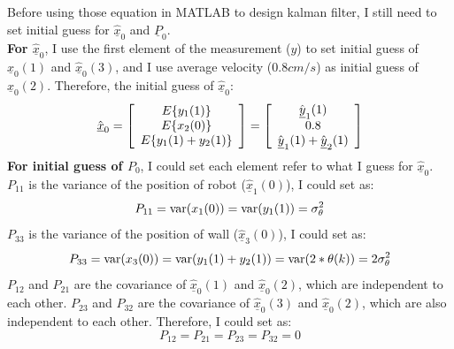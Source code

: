 \documentclass{article}
\begin{document}
Before using those equation in MATLAB to design kalman filter, I still need to set initial guess for $\hat{\underline{x}}_0$ and $\underline{P}_0$.\\
\textbf{For $\hat{\underline{x}}_0$}, I use the first element of the measurement ($y$) to set initial guess of $\hat{\underline{x}}_0 (1)$ and $\hat{\underline{x}}_0 (3)$, 
and I use average velocity ($0.8 cm/s$) as initial guess of $\hat{\underline{x}}_0 (2)$. Therefore, the initial guess of $\hat{\underline{x}}_0$:
\begin{equation}
\hat{\underline{x}}_0  = \left[ {\begin{array}{*{20}c}
   {E\{ y_1 (1)\} }  \\
   {E\{ x_2 (0)\} }  \\
   {E\{ y_1 (1) + y_2 (1)\} }  \\
\end{array}} \right] = \left[ {\begin{array}{*{20}c}
   {\hat{\underline{y}}_1 (1)}  \\
   {0.8}  \\
   {\hat{\underline{y}}_1 (1) + \hat{\underline{y}}_2 (1)}  \\
\end{array}} \right]
\end{equation}
\textbf{For initial guess of $P_0$}, I could set each element refer to what I guess for $\hat{\underline{x}}_0$.\\
$P_{11}$ is the variance of the position of robot ($\hat{\underline{x}}_1 (0)$), I could set as:
\begin{equation}
	P_{11}  = {\mathop{\rm var}} (x_1 (0)) = {\mathop{\rm var}} (y_1 (1)) = \sigma _\theta ^2 
\end{equation}
$P_{33}$ is the variance of the position of wall ($\hat{\underline{x}}_3 (0)$), I could set as:
\begin{equation}
	P_{33}  = {\mathop{\rm var}} (x_3 (0)) = {\mathop{\rm var}} (y_1 (1) + y_2 (1)) = {\mathop{\rm var}} (2*\theta (k)) = 2\sigma _\theta ^2 
\end{equation}
$P_{12}$ and $P_{21}$ are the covariance of $\hat{\underline{x}}_0 (1)$ and $\hat{\underline{x}}_0 (2)$, which are independent to each other.
$P_{23}$ and $P_{32}$ are the covariance of $\hat{\underline{x}}_0 (3)$ and $\hat{\underline{x}}_0 (2)$, which are also independent to each other.
Therefore, I could set as:
\begin{equation}
	P_{12}  = P_{21}  = P_{23}  = P_{32}  = 0
\end{equation}
\end{document}
